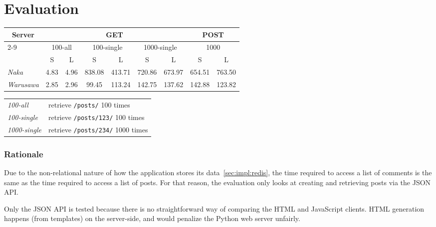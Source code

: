 \section{\label{sec:eval}Evaluation}

\begin{table*}
    \centering
    \begin{tabular}{l*{8}c}
        \toprule
        \multicolumn{1}{c}{\textbf{Server}} & \multicolumn{6}{c}{\textbf{GET}} & \multicolumn{2}{c}{\textbf{POST}} \\
        \cmidrule{2-9}
        & \multicolumn{2}{c}{100-all} & \multicolumn{2}{c}{100-single} & \multicolumn{2}{c}{1000-single} & \multicolumn{2}{c}{1000} \\
        & S & L & S & L & S & L & S & L \\ 
        \midrule
        \emph{Naka} & 4.83 & 4.96 & 838.08 & 413.71 & 720.86 & 673.97 & 654.51 & 763.50 \\
        \emph{Warusawa} & 2.85 & 2.96 & 99.45 & 113.24 & 142.75 & 137.62 & 142.88 & 123.82 \\
        \bottomrule
    \end{tabular}
    \caption{Average requests/second}
    \caption*{\textbf{GET} Legend}
        \begin{tabular}{*{2}l}
            \toprule
            \emph{100-all} & retrieve \texttt{/posts/} 100 times \\
            \emph{100-single} & retrieve \texttt{/posts/123/} 100 times \\
            \emph{1000-single} & retrieve \texttt{/posts/234/} 1000 times \\
            \bottomrule
        \end{tabular}
    \label{tab:eval}
\end{table*}

\subsubsection*{\label{sec:eval:rationale}Rationale}

Due to the non-relational nature of how the application stores its data~\ref{sec:impl:redis}, the time required to access a list of comments is the same as the time required to access a list of posts. For that reason, the evaluation only looks at creating and retrieving posts via the JSON API.

Only the JSON API is tested because there is no straightforward way of comparing the HTML and JavaScript clients. HTML generation happens (from templates) on the server-side, and would penalize the Python web server unfairly.

